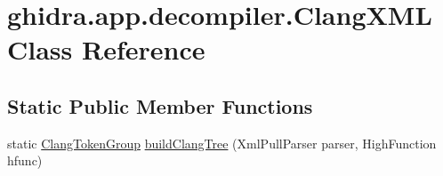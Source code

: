 \hypertarget{classghidra_1_1app_1_1decompiler_1_1_clang_x_m_l}{}\section{ghidra.\+app.\+decompiler.\+Clang\+X\+ML Class Reference}
\label{classghidra_1_1app_1_1decompiler_1_1_clang_x_m_l}
\subsection*{Static Public Member Functions}
\begin{DoxyCompactItemize}
\item 
static \mbox{\hyperlink{classghidra_1_1app_1_1decompiler_1_1_clang_token_group}{Clang\+Token\+Group}} \mbox{\hyperlink{classghidra_1_1app_1_1decompiler_1_1_clang_x_m_l_a7d199e84524827441bde7534fa5ea4c8}{build\+Clang\+Tree}} (Xml\+Pull\+Parser parser, High\+Function hfunc)
\end{DoxyCompactItemize}
